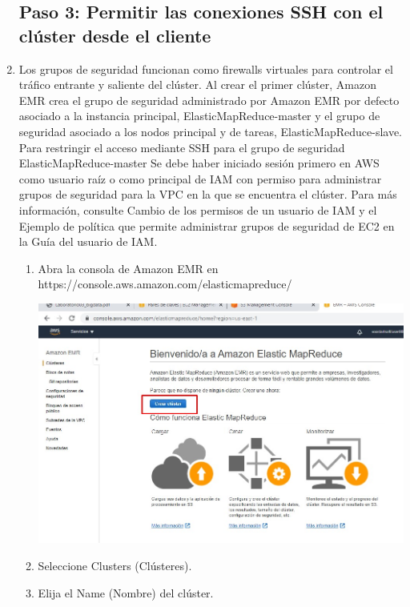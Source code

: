 \documentclass[12pt,letterpaper]{article}
\begin{document}
\begin{enumerate}
	\subsection{Paso 3: Permitir las conexiones SSH con el clúster desde el cliente }
		\item	Los grupos de seguridad funcionan como firewalls virtuales para controlar el tráfico entrante y saliente del
		clúster. Al crear el primer clúster, Amazon EMR crea el grupo de seguridad administrado por Amazon EMR
		por defecto asociado a la instancia principal, ElasticMapReduce-master y el grupo de seguridad asociado a
		los nodos principal y de tareas, ElasticMapReduce-slave.
		Para restringir el acceso mediante SSH para el grupo de seguridad ElasticMapReduce-master Se debe haber
		iniciado sesión primero en AWS como usuario raíz o como principal de IAM con permiso para administrar
		grupos de seguridad para la VPC en la que se encuentra el clúster. Para más información, consulte Cambio
		de los permisos de un usuario de IAM y el Ejemplo de política que permite administrar grupos de seguridad
		de EC2 en la Guía del usuario de IAM.

	\begin{enumerate}
		
		\item Abra la consola de Amazon EMR en https://console.aws.amazon.com/elasticmapreduce/
	\begin{center}
		\includegraphics[width=14cm]{./img/3.1.jpg} 
	\end{center}
		\item Seleccione Clusters (Clústeres). 

		
		\item
		 Elija el Name (Nombre) del clúster. 
		

\end{enumerate}
\end{enumerate}
\end{document}
